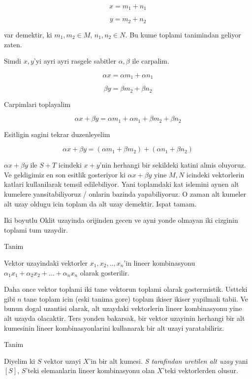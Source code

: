 \documentclass[12pt,fleqn]{article}
\begin{document}
\[ x = m_1 + n_1 \]

\[ y = m_2 + n_2 \]

var demektir, ki $m_1,m_2 \in M$, $n_1,n_2 \in N$. Bu kume toplami
tanimindan geliyor zaten. 

Simdi $x,y$'yi ayri ayri rasgele sabitler $\alpha,\beta$ ile carpalim. 

\[ \alpha x = \alpha m_1 + \alpha n_1 \]

\[ \beta y = \beta m_2 + \beta n_2 \]

Carpimlari toplayalim

\[ \alpha x + \beta y  = \alpha m_1 + \alpha n_1 + \beta m_2 + \beta n_2 \]

Esitligin sagini tekrar duzenleyelim

\[ \alpha x + \beta y  = (\alpha m_1 + \beta m_2) + (\alpha n_1  + \beta n_2 )\]

$\alpha x + \beta y $ ile $S+T$ icindeki $x+y$'nin herhangi bir sekildeki
katini almis oluyoruz. Ve geldigimiz en son esitlik gosteriyor 
ki $\alpha x
+ \beta y$ yine $M,N$ icindeki vektorlerin katlari kullanilarak 
temsil edilebiliyor. Yani toplamdaki kat islemini aynen alt kumelere
yansitabiliyoruz / onlarin bazinda yapabiliyoruz. O zaman alt kumeler alt
uzay oldugu icin toplam da alt uzay demektir. Ispat tamam.

Iki boyutlu Oklit uzayinda orijinden gecen ve ayni yonde olmayan iki cizginin
toplami tum uzaydir. 

Tanim

Vektor uzayindaki vektorler $x_1,x_2,..,x_n$'in lineer kombinasyonu
$\alpha_1 x_1 + \alpha_2 x_2 + ... + \alpha_n x_n$ olarak gosterilir. 

Daha once vektor toplami iki tane vektorun toplami olarak
gostermistik. Ustteki gibi $n$ tane toplam icin (eski tanima gore) toplam
ikiser ikiser yapilmali tabii. Ve bunun dogal uzantisi olarak, alt
uzaydaki vektorlerin lineer kombinasyonu yine alt uzayda olacaktir. Ters
yonden bakarsak, bir vektor uzayinin herhangi bir alt kumesinin lineer
kombinasyonlarini kullanarak bir alt uzayi yaratabiliriz. 

Tanim

Diyelim ki $S$ vektor uzayi $X$'in bir alt kumesi. {\em S tarafindan
  uretilen alt uzay} yani $[S]$, $S$'teki elemanlarin lineer
kombinasyonu olan $X$'teki vektorlerden olusur. 
\end{document}
